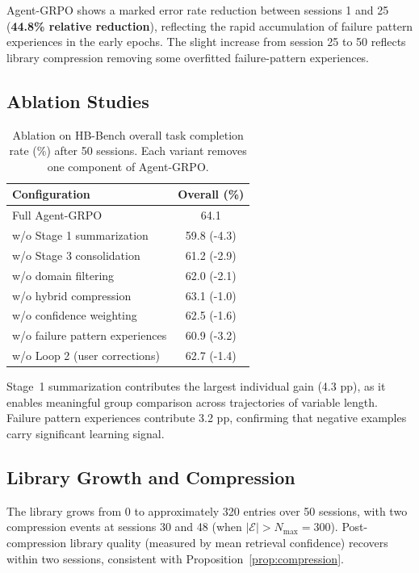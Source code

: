 Agent-GRPO shows a marked error rate reduction between sessions 1 and 25
(\textbf{44.8\% relative reduction}), reflecting the rapid accumulation of
failure pattern experiences in the early epochs. The slight increase from
session 25 to 50 reflects library compression removing some overfitted
failure-pattern experiences.

\subsection{Ablation Studies}

\begin{table}[H]
\centering
\caption{Ablation on HB-Bench overall task completion rate (\%) after 50 sessions.
Each variant removes one component of Agent-GRPO.}
\label{tab:ablation}
\begin{tabular}{lc}
\toprule
\textbf{Configuration} & \textbf{Overall (\%)} \\
\midrule
Full Agent-GRPO                       & 64.1 \\
\quad w/o Stage 1 summarization       & 59.8 (-4.3) \\
\quad w/o Stage 3 consolidation       & 61.2 (-2.9) \\
\quad w/o domain filtering            & 62.0 (-2.1) \\
\quad w/o hybrid compression          & 63.1 (-1.0) \\
\quad w/o confidence weighting        & 62.5 (-1.6) \\
\quad w/o failure pattern experiences & 60.9 (-3.2) \\
\quad w/o Loop 2 (user corrections)   & 62.7 (-1.4) \\
\bottomrule
\end{tabular}
\end{table}

Stage~1 summarization contributes the largest individual gain (4.3 pp), as
it enables meaningful group comparison across trajectories of variable length.
Failure pattern experiences contribute 3.2 pp, confirming that negative
examples carry significant learning signal.

\subsection{Library Growth and Compression}

The library grows from 0 to approximately 320 entries over 50 sessions, with
two compression events at sessions 30 and 48 (when $|\mathcal{E}| > N_{\max} = 300$).
Post-compression library quality (measured by mean retrieval confidence)
recovers within two sessions, consistent with Proposition~\ref{prop:compression}.


